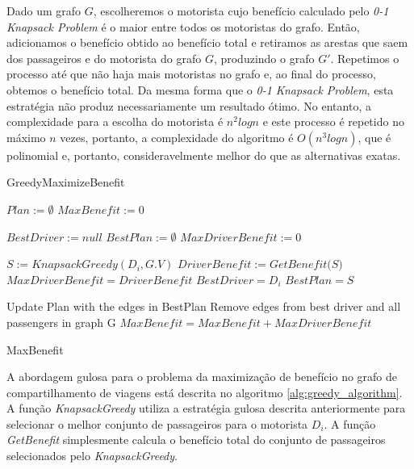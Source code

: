 \documentclass{article}
\begin{document}
Dado um grafo $ G $, escolheremos o motorista cujo benefício calculado pelo \textit{0-1 Knapsack Problem} é o maior entre
todos os motoristas do grafo. Então, adicionamos o benefício obtido ao benefício total e retiramos as arestas 
que saem dos passageiros e do motorista do grafo $ G $, produzindo o grafo $ G' $. Repetimos o processo até que não haja mais 
motoristas no grafo e, ao final do processo, obtemos o benefício total. Da mesma forma que o \textit{0-1 Knapsack Problem}, esta estratégia não
produz necessariamente um resultado ótimo. No entanto, a complexidade para a escolha do motorista é $ n^2logn $ e este processo é repetido
no máximo $ n $ vezes, portanto, a complexidade do algoritmo é $ O(n^3logn) $, que é polinomial e, portanto, consideravelmente melhor do 
que as alternativas exatas.

\begin{algorithm}
\caption{GreedyMaximizeBenefit}
\begin{algorithmic}[1]

\State $ Plan := \emptyset $
\State $ MaxBenefit := 0 $
\item {}
  \State $ BestDriver := null $
  \State $ BestPlan := \emptyset $
  \State $ MaxDriverBenefit := 0 $
  \item {}
    \State $ S := KnapsackGreedy(D_i, G.V) $
    \State $ DriverBenefit := \textit{GetBenefit(S)} $
      \State $ MaxDriverBenefit = DriverBenefit $
      \State $ BestDriver = D_i $
      \State $ BestPlan = S $
    \EndIf
  \EndFor

  \State Update Plan with the edges in BestPlan
  \State Remove edges from best driver and all passengers in graph G
  \State $ MaxBenefit = MaxBenefit + MaxDriverBenefit $
\EndWhile

\Return MaxBenefit

\EndProcedure
\end{algorithmic}
\label{alg:greedy_algorithm}
\end{algorithm}

A abordagem gulosa para o problema da maximização de benefício no grafo de compartilhamento de viagens está
descrita no algoritmo \ref{alg:greedy_algorithm}. A função \textit{KnapsackGreedy} utiliza a estratégia gulosa descrita anteriormente
para selecionar o melhor conjunto de passageiros para o motorista $ D_i $. A função \textit{GetBenefit} simplesmente
calcula o benefício total do conjunto de passageiros selecionados pelo \textit{KnapsackGreedy}.
\end{document}
